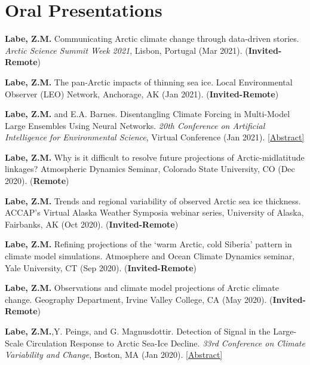 \documentclass[margin,line,palatino,courier,10pt]{res}
\begin{document}
\begin{resume}
\vspace{-0.1in}
\noindent\textcolor{Cerulean}{\makebox[\linewidth][r]{\rule{\textwidth}{5pt}}}
\vspace{-0.3in} 

\section{\sc \textcolor{Cerulean}{\large{\textbf{Oral Presentations}}}}
\begin{etaremune}[leftmargin=0in,topsep=0in,parsep=0in]
\item \textbf{Labe, Z.M.} Communicating Arctic climate change through data-driven stories. \textit{Arctic Science Summit Week 2021}, Lisbon, Portugal (Mar 2021). (\textbf{Invited-Remote})
\item \textbf{Labe, Z.M.} The pan-Arctic impacts of thinning sea ice. Local Environmental Observer (LEO) Network, Anchorage, AK (Jan 2021). (\textbf{Invited-Remote})
\item \textbf{Labe, Z.M.} and E.A. Barnes. Disentangling Climate Forcing in Multi-Model Large Ensembles Using Neural Networks. \textit{20th Conference on Artificial Intelligence for Environmental Science}, Virtual Conference (Jan 2021). \href{https://ams.confex.com/ams/101ANNUAL/meetingapp.cgi/Paper/379553}{[Abstract]}
\item \textbf{Labe, Z.M.} Why is it difficult to resolve future projections of Arctic-midlatitude linkages? Atmospheric Dynamics Seminar, Colorado State University, CO (Dec 2020). (\textbf{Remote})
\item \textbf{Labe, Z.M.} Trends and regional variability of observed Arctic sea ice thickness. ACCAP’s Virtual Alaska Weather Symposia webinar series, University of Alaska, Fairbanks, AK (Oct 2020). (\textbf{Invited-Remote})
\item \textbf{Labe, Z.M.} Refining projections of the `warm Arctic, cold Siberia' pattern in climate model simulations. Atmosphere and Ocean Climate Dynamics seminar, Yale University, CT (Sep 2020). (\textbf{Invited-Remote})
\item \textbf{Labe, Z.M.} Observations and climate model projections of Arctic climate change. Geography Department, Irvine Valley College, CA (May 2020). (\textbf{Invited-Remote})
\item \textbf{Labe, Z.M.},Y. Peings, and G. Magnusdottir. Detection of Signal in the Large-Scale Circulation Response to Arctic Sea-Ice Decline. \textit{33rd Conference on Climate Variability and Change}, Boston, MA (Jan 2020). \href{https://ams.confex.com/ams/2020Annual/meetingapp.cgi/Paper/367289}{[Abstract]}

\end{etaremune}
\end{resume}
\end{document}
